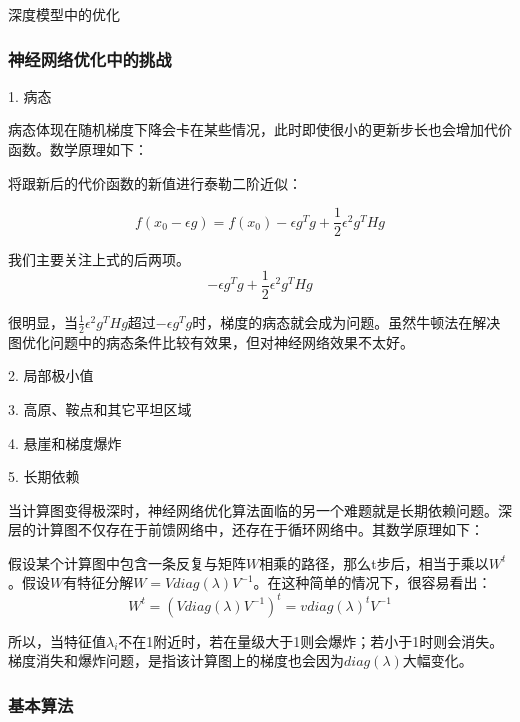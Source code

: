 深度模型中的优化

\subsubsection{神经网络优化中的挑战}

1. 病态

病态体现在随机梯度下降会卡在某些情况，此时即使很小的更新步长也会增加代价函数。数学原理如下：

将跟新后的代价函数的新值进行泰勒二阶近似：

\begin{displaymath}
f(x_0 - \epsilon g) = f(x_0) - \epsilon g^T g + \frac{1}{2} \epsilon^2 g^T H g
\end{displaymath}

我们主要关注上式的后两项。
\begin{displaymath}
- \epsilon g^T g + \frac{1}{2} \epsilon^2 g^T H g
\end{displaymath}

很明显，当$\frac{1}{2} \epsilon^2 g^T H g$超过$- \epsilon g^T g$时，梯度的病态就会成为问题。虽然牛顿法在解决图优化问题中的病态条件比较有效果，但对神经网络效果不太好。

2. 局部极小值

3. 高原、鞍点和其它平坦区域

4. 悬崖和梯度爆炸

5. 长期依赖

当计算图变得极深时，神经网络优化算法面临的另一个难题就是长期依赖问题。深层的计算图不仅存在于前馈网络中，还存在于循环网络中。其数学原理如下：

假设某个计算图中包含一条反复与矩阵$W$相乘的路径，那么t步后，相当于乘以$W^t$。假设$W$有特征分解$W = V diag(\lambda) V^{-1}$。在这种简单的情况下，很容易看出：
\begin{displaymath}
W^t = (V diag(\lambda) V^{-1})^t = v diag(\lambda)^t V^{-1}
\end{displaymath}

所以，当特征值$\lambda_i$不在1附近时，若在量级大于1则会爆炸；若小于1时则会消失。梯度消失和爆炸问题，是指该计算图上的梯度也会因为$diag(\lambda)$大幅变化。

\subsubsection{基本算法}

